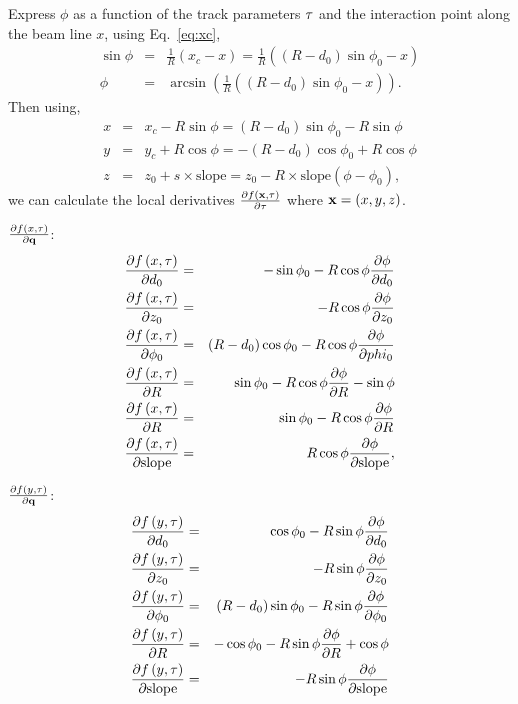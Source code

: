 \documentclass{article}
\def\slope{\ensuremath{\mathrm{slope}}}
\def\vec#1{\ensuremath{\mathrm{\bf #1}}}
\def\qvec{\ensuremath{\mathrm{\bf q}}}
\def\partder#1#2{\ensuremath{\frac{\partial #1}{\partial #2}}}
\begin{document}
Express $\phi$ as a function of the track parameters $\vec{\tau}$ and the 
interaction point along the beam line $x$, using Eq.~\ref{eq:xc},
\begin{eqnarray}
\sin\phi &=& \frac{1}{R}\left( x_c-x \right) =  \frac{1}{R}\left( \left(R-d_0\right)\sin\phi_0 - x \right) \nonumber \\ 
\phi &=& \arcsin\left( \frac{1}{R}\left(  \left(R-d_0\right)\sin\phi_0 - x \right) \right). \label{eq:phifromsin}
\end{eqnarray}
Then using, 
\begin{eqnarray}
x &=& x_c - R\sin\phi = (R-d_0)\sin\phi_0 - R\sin\phi \nonumber \\
y &=& y_c + R\cos\phi = -(R-d_0)\cos\phi_0 + R\cos\phi \nonumber \\
z &=& z_0 + s\times\slope=z_0-R\times\slope\left( \phi - \phi_0 \right),
\end{eqnarray}
we can calculate the local derivatives $\partder{f(\vec{x},\vec{\tau})}{\vec{\tau}}$ where $\vec{x}=(x,y,z)$. 

$\partder{f\left(x,\vec{\tau} \right)}{\qvec}$:
\begin{eqnarray}
\partder{f\left(x,\vec{\tau} \right)}{d_0} &=& -\sin\phi_0 - R\cos\phi\partder{\phi}{d_0} \nonumber  \\
\partder{f\left(x,\vec{\tau} \right)}{z_0} &=& -R\cos\phi\partder{\phi}{z_0} \nonumber  \\
\partder{f\left(x,\vec{\tau} \right)}{\phi_0} &=& (R-d_0)\cos\phi_0 - R\cos\phi\partder{\phi}{phi_0} \nonumber  \\
\partder{f\left(x,\vec{\tau} \right)}{R} &=& \sin\phi_0 - R\cos\phi\partder{\phi}{R}  - \sin\phi  \nonumber \\
\partder{f\left(x,\vec{\tau} \right)}{R} &=& \sin\phi_0 - R\cos\phi\partder{\phi}{R}  \nonumber \\
\partder{f\left(x,\vec{\tau} \right)}{\slope} &=& R\cos\phi\partder{\phi}{\slope},
\end{eqnarray}

$\partder{f\left(y,\vec{\tau} \right)}{\qvec}$:
\begin{eqnarray}
\partder{f\left(y,\vec{\tau} \right)}{d_0} &=& \cos\phi_0 - R\sin\phi\partder{\phi}{d_0} \nonumber  \\
\partder{f\left(y,\vec{\tau} \right)}{z_0} &=& -R\sin\phi\partder{\phi}{z_0} \nonumber  \\
\partder{f\left(y,\vec{\tau} \right)}{\phi_0} &=& (R-d_0)\sin\phi_0 - R\sin\phi\partder{\phi}{\phi_0} \nonumber  \\
\partder{f\left(y,\vec{\tau} \right)}{R} &=& -\cos\phi_0 - R\sin\phi\partder{\phi}{R} + \cos\phi \nonumber \\
\partder{f\left(y,\vec{\tau} \right)}{\slope} &=& -R\sin\phi\partder{\phi}{\slope}
\end{eqnarray}
\end{document}
